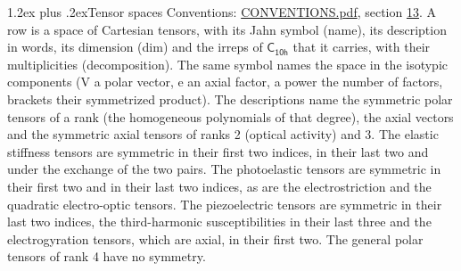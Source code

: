 \documentclass[10pt,a4paper]{article}
\makeatletter
\renewcommand\section{\@startsection{section}{1}{\z@}{-3ex plus -1ex minus -.2ex}%
  {1.2ex plus .2ex}{\normalfont\large\sffamily\bfseries\color{parttitle}}}
\numberwithin{equation}{section}
\newcommand{\grp}[1]{\mathsf{#1}}
\makeatother
\begin{document}
\section{Tensor spaces}\label{s:tensor_spaces}
Conventions: \href{../../CONVENTIONS.pdf}{CONVENTIONS.pdf}, section \href{../../CONVENTIONS.pdf\#conv.13}{13}.
\leavevmode\label{n:head.name}\label{n:head.description}\label{n:head.dim}\label{n:head.decomposition}A row is a space of Cartesian tensors, with its Jahn symbol (name), its description in words, its dimension (dim) and the irreps of $\grp{C_{10h}}$ that it carries, with their multiplicities (decomposition). \label{n:label.jahn}The same symbol names the space in the isotypic components (V a polar vector, e an axial factor, a power the number of factors, brackets their symmetrized product). The descriptions name the symmetric polar tensors of a rank (the homogeneous polynomials of that degree), the axial vectors and the symmetric axial tensors of ranks 2 (optical activity) and 3. The elastic stiffness tensors are symmetric in their first two indices, in their last two and under the exchange of the two pairs. The photoelastic tensors are symmetric in their first two and in their last two indices, as are the electrostriction and the quadratic electro-optic tensors. The piezoelectric tensors are symmetric in their last two indices, the third-harmonic susceptibilities in their last three and the electrogyration tensors, which are axial, in their first two. The general polar tensors of rank 4 have no symmetry.
\end{document}
